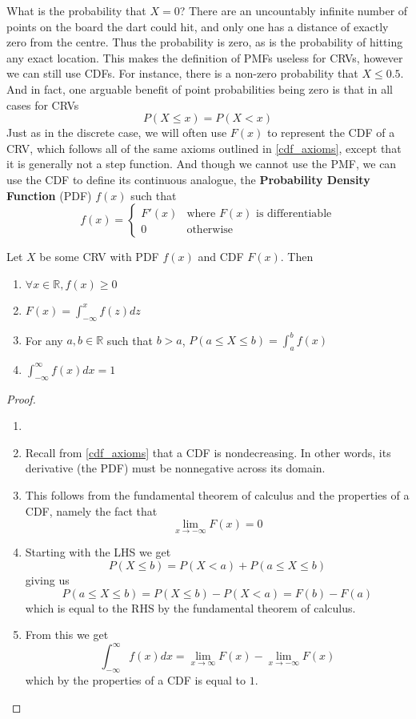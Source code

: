 \documentclass{report}
\begin{document}
What is the probability that $X=0$? There are an uncountably infinite number of points on the board the dart could hit, and only one has a distance of exactly zero from the centre. Thus the probability is zero, as is the probability of hitting any exact location. This makes the definition of PMFs useless for CRVs, however we can still use CDFs. For instance, there is a non-zero probability that $X\le 0.5$. And in fact, one arguable benefit of point probabilities being zero is that in all cases for CRVs\[
    P(X\le x)= P(X< x)
\]
Just as in the discrete case, we will often use $F(x)$ to represent the CDF of a CRV, which follows all of the same axioms outlined in \ref{cdf_axioms}, except that it is generally not a step function. And though we cannot use the PMF, we can use the CDF to define its continuous analogue, the \textbf{Probability Density Function} (PDF) $f(x)$ such that
\[
    f(x) = \begin{cases}
        F'(x) & \text{where $F(x)$ is differentiable}
        \\
        0 & \text{otherwise}
    \end{cases}
\]
\begin{theorem}
    Let $X$ be some CRV with PDF $f(x)$ and CDF $F(x)$. Then
    \begin{enumerate}
        \item $\forall x\in\mathbb R, f(x)\ge 0$
        \item $F(x)=\int_{-\infty}^x f(z)dz$
        \item For any $a,b\in\mathbb R$ such that $b>a$, $P(a\le X\le b)=\int_a^b f(x)$
        \item $\int_{-\infty}^\infty f(x)dx = 1$
    \end{enumerate}
    \begin{proof}
        \begin{enumerate}
            \item[]
            \item Recall from \ref{cdf_axioms} that a CDF is nondecreasing. In other words, its derivative (the PDF) must be nonnegative across its domain.
            \item This follows from the fundamental theorem of calculus and the properties of a CDF, namely the fact that
            \[
                \lim_{x\to-\infty} F(x)=0
            \]
            \item Starting with the LHS we get
            \[
                P(X\le b)=P(X< a)+P(a\le X\le b)
            \]
            giving us
            \[
                P(a\le X\le b)=P(X\le b)-P(X<a)=F(b)-F(a)
            \]
            which is equal to the RHS by the fundamental theorem of calculus.
            \item
            From this we get
            \[
                \int_{-\infty}^\infty f(x)dx = \lim_{x\to \infty} F(x) -\lim_{x\to -\infty} F(x)
            \]
            which by the properties of a CDF is equal to $1$.
        \end{enumerate}
    \end{proof}
\end{theorem}
\end{document}
